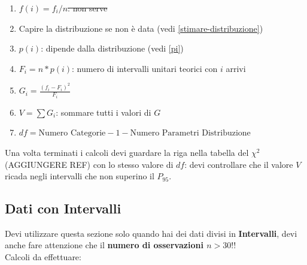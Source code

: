 \begin{enumerate}
\begin{enumerate}
                  \item \st{$f(i) = f_i / n$: non serve}
                  \item Capire la distribuzione se non è data (vedi
                        \ref{stimare-distribuzione})
                  \item $p(i)$: dipende dalla distribuzione (vedi \ref{pi})
                  \item $F_i = n * p(i)$: numero di intervalli unitari teorici
                        con $i$ arrivi
                  \item $G_i = \frac{(f_i - F_i)^2}{F_i}$
                  \item $V = \sum G_i$: sommare tutti i valori di $G$
                  \item $df = \text{Numero Categorie} - 1 - \text{Numero
                                    Parametri Distribuzione}$
            \end{enumerate}
\end{enumerate}

Una volta terminati i calcoli devi guardare la riga nella tabella del $\chi^2$
(AGGIUNGERE REF) con lo stesso valore di $df$: devi controllare che il valore
$V$ ricada negli intervalli che non superino il $P_{95}$.

\subsection{Dati con Intervalli}

Devi utilizzare questa sezione solo quando hai dei dati divisi in
\textbf{Intervalli}, devi anche fare attenzione che il \textbf{numero di
      osservazioni $n > 30$}!!\\

Calcoli da effettuare:

